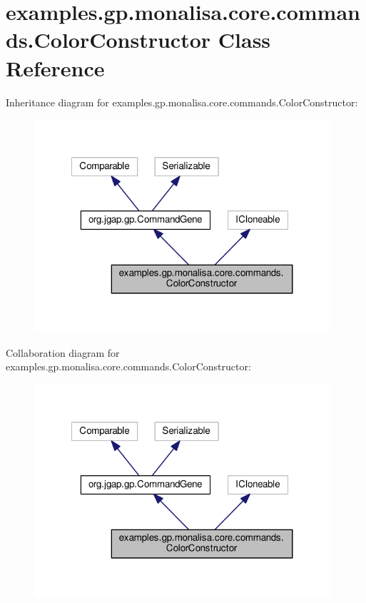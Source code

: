 \hypertarget{classexamples_1_1gp_1_1monalisa_1_1core_1_1commands_1_1_color_constructor}{\section{examples.\-gp.\-monalisa.\-core.\-commands.\-Color\-Constructor Class Reference}
\label{classexamples_1_1gp_1_1monalisa_1_1core_1_1commands_1_1_color_constructor}
}


Inheritance diagram for examples.\-gp.\-monalisa.\-core.\-commands.\-Color\-Constructor\-:
\nopagebreak
\begin{figure}[H]
\begin{center}
\leavevmode
\includegraphics[width=311pt]{classexamples_1_1gp_1_1monalisa_1_1core_1_1commands_1_1_color_constructor__inherit__graph}
\end{center}
\end{figure}


Collaboration diagram for examples.\-gp.\-monalisa.\-core.\-commands.\-Color\-Constructor\-:
\nopagebreak
\begin{figure}[H]
\begin{center}
\leavevmode
\includegraphics[width=311pt]{classexamples_1_1gp_1_1monalisa_1_1core_1_1commands_1_1_color_constructor__coll__graph}
\end{center}
\end{figure}
